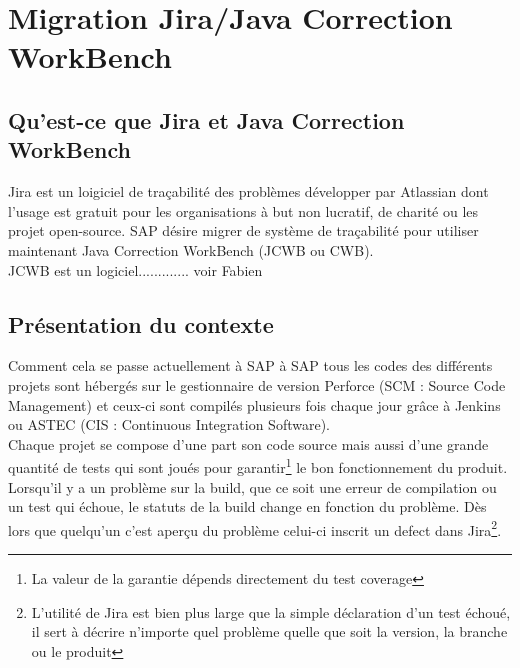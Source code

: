 \chapter{Migration Jira/Java Correction WorkBench}\label{chapitre:migration}

\section{Qu'est-ce que Jira et Java Correction WorkBench}
Jira est un loigiciel de tra\c{c}abilit\'{e} des probl\`{e}mes d\'{e}velopper par Atlassian dont l'usage est gratuit pour les organisations \`{a} but non lucratif, de charit\'{e} ou les projet open-source. SAP désire migrer de système de traçabilité pour utiliser maintenant Java Correction WorkBench (JCWB ou CWB).\\

JCWB est un logiciel............. voir Fabien



\section{Pr\'{e}sentation du contexte}

Comment cela se passe actuellement \`{a} SAP
à SAP tous les codes des différents projets sont hébergés sur le gestionnaire de version Perforce (SCM : Source Code Management)
et ceux-ci sont compilés plusieurs fois chaque jour grâce à Jenkins ou ASTEC (CIS : Continuous Integration Software).\\
Chaque projet se compose d'une part son code source mais aussi d'une grande quantité de tests qui sont joués pour garantir\footnote{La valeur de la garantie dépends directement du test coverage} le bon fonctionnement du produit. Lorsqu'il y a un problème sur la build, que ce soit une erreur de compilation ou un test qui échoue, le statuts de la build change en fonction du problème. Dès lors que quelqu'un c'est aperçu du problème celui-ci inscrit un defect dans Jira\footnote{L'utilité de Jira est bien plus large que la simple déclaration d'un test échoué, il sert à décrire n'importe quel problème quelle que soit la version, la branche ou le produit}.\\


